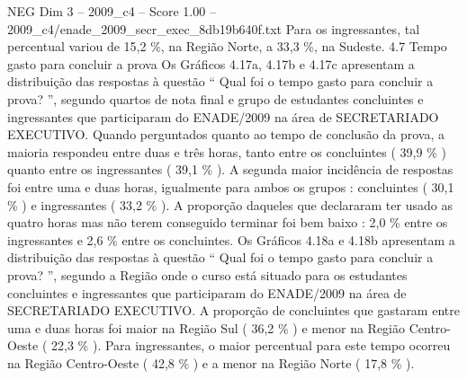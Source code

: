 \begin{textsample}{NEG Dim 3 – 2009\_c4 – Score 1.00 – 2009\_c4/enade\_2009\_secr\_exec\_8db19b640f.txt}
Para os ingressantes, tal percentual variou de 15,2 \%, na Região Norte, a 33,3 \%, na Sudeste. 4.7 Tempo gasto para concluir a prova Os Gráficos 4.17a, 4.17b e 4.17c apresentam a distribuição das respostas à questão “ Qual foi o tempo gasto para concluir a prova? ”, segundo quartos de nota final e grupo de estudantes concluintes e ingressantes que participaram do ENADE/2009 na área de SECRETARIADO EXECUTIVO.
Quando perguntados quanto ao tempo de conclusão da prova, a maioria respondeu entre duas e três horas, tanto entre os concluintes ( 39,9 \% ) quanto entre os ingressantes ( 39,1 \% ).
A segunda maior incidência de respostas foi entre uma e duas horas, igualmente para ambos os grupos : concluintes ( 30,1 \% ) e ingressantes ( 33,2 \% ).
A proporção daqueles que declararam ter usado as quatro horas mas não terem conseguido terminar foi bem baixo : 2,0 \% entre os ingressantes e 2,6 \% entre os concluintes.
Os Gráficos 4.18a e 4.18b apresentam a distribuição das respostas à questão “ Qual foi o tempo gasto para concluir a prova? ”, segundo a Região onde o curso está situado para os estudantes concluintes e ingressantes que participaram do ENADE/2009 na área de SECRETARIADO EXECUTIVO.
A proporção de concluintes que gastaram entre uma e duas horas foi maior na Região Sul ( 36,2 \% ) e menor na Região Centro-Oeste ( 22,3 \% ).
Para ingressantes, o maior percentual para este tempo ocorreu na Região Centro-Oeste ( 42,8 \% ) e a menor na Região Norte ( 17,8 \% ).

\end{textsample}
